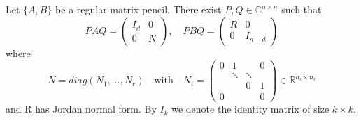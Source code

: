 \begin{theorem}
	\label{Kronecker-normalform}
	Let $\{ A,B \}$ be a regular matrix pencil. There exist $P,Q \in \mathbb{C}^{n \times n}$ such that
	\begin{displaymath}
		PAQ = 
		\left(
		\begin{matrix}
			I_d & 0 \\
			0 & N 
		\end{matrix}
		\right), \quad
		PBQ = 
		\left(
		\begin{matrix}
			R & 0 \\
			0 & I_{n-d}
		\end{matrix}
		\right)
	\end{displaymath}
	where
	\begin{displaymath}
		N = diag(N_1, ..., N_r) \quad \text{with} \quad N_i = 
		\left(
		\begin{matrix}
			0 & 1 & & 0\\
			& \ddots &\ddots & \\
			& & 0 & 1 \\
			0 & & & 0
		\end{matrix}
		\right)
		\in \mathbb{R}^{n_i \times n_i}
	\end{displaymath}
	and R has Jordan normal form. By $I_k$ we denote the identity matrix of size $k \times k$.
\end{theorem}

